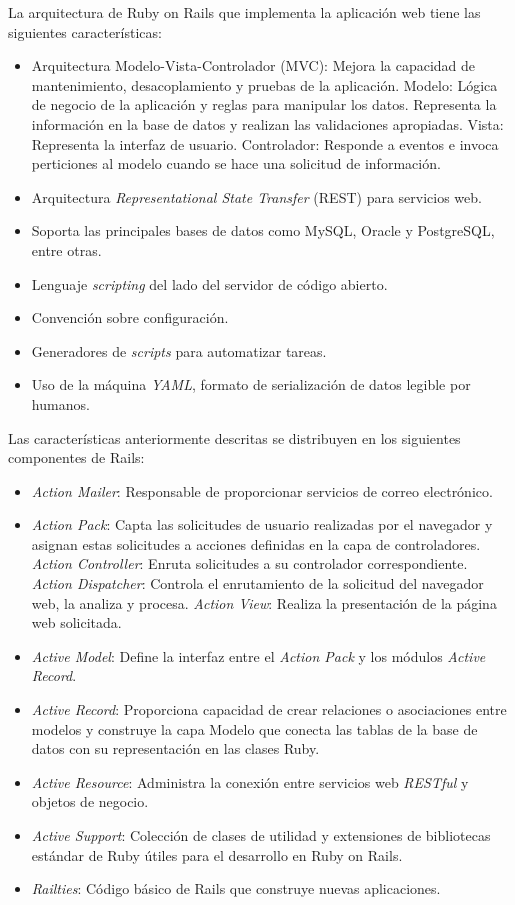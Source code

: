 La arquitectura de Ruby on Rails que implementa la aplicación web tiene las siguientes características:
\begin{itemize}
\item Arquitectura Modelo-Vista-Controlador (MVC): Mejora la capacidad de mantenimiento, desacoplamiento y pruebas de la aplicación.
\subitem Modelo: Lógica de negocio de la aplicación y reglas para manipular los datos. Representa la información en la base de datos y realizan las validaciones apropiadas.
\subitem Vista: Representa la interfaz de usuario.
\subitem Controlador: Responde a eventos e invoca perticiones al modelo cuando se hace una solicitud de información.
\item Arquitectura \textit{Representational State Transfer} (REST) para servicios web.
\item Soporta las principales bases de datos como MySQL, Oracle y PostgreSQL, entre otras.
\item Lenguaje \textit{scripting} del lado del servidor de código abierto.
\item Convención sobre configuración.
\item Generadores de \textit{scripts} para automatizar tareas.
\item Uso de la máquina \textit{YAML}, formato de serialización de datos legible por humanos.
\end{itemize}

Las características anteriormente descritas se distribuyen en los siguientes componentes de Rails:
\begin{itemize}
\item \textit{Action Mailer}: Responsable de proporcionar servicios de correo electrónico. 
\item \textit{Action Pack}: Capta las solicitudes de usuario realizadas por el navegador y asignan estas solicitudes a acciones definidas en la capa de controladores.
\subitem \textit{Action Controller}: Enruta solicitudes a su controlador correspondiente. 
\subitem \textit{Action Dispatcher}: Controla el enrutamiento de la solicitud del navegador web, la analiza y procesa.
\subitem \textit{Action View}: Realiza la presentación de la página web solicitada.
\item \textit{Active Model}: Define la interfaz entre el \textit{Action Pack} y los módulos \textit{Active Record}.
\item \textit{Active Record}: Proporciona capacidad de crear relaciones o asociaciones entre modelos y construye la capa Modelo que conecta las tablas de la base de datos con su representación en las clases Ruby.
\item \textit{Active Resource}: Administra la conexión entre servicios web \textit{RESTful} y objetos de negocio.
\item \textit{Active Support}: Colección de clases de utilidad y extensiones de bibliotecas estándar de Ruby útiles para el desarrollo en Ruby on Rails.
\item \textit{Railties}: Código básico de Rails que construye nuevas aplicaciones. \end{itemize}	 

